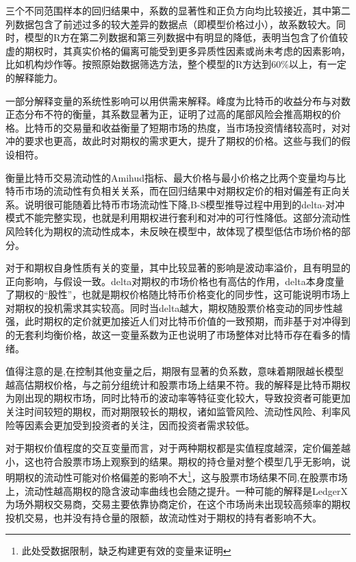 \newpage
\restoregeometry
\par{三个不同范围样本的回归结果中，系数的显著性和正负方向均比较接近，其中第二列数据包含了前述过多的较大差异的数据点（即模型价格过小），故系数较大。同时，模型的R方在第二列数据和第三列数据中有明显的降低，表明当包含了价值较虚的期权时，其真实价格的偏离可能受到更多异质性因素或尚未考虑的因素影响，比如机构炒作等。按照原始数据筛选方法，整个模型的R方达到60$\%$以上，有一定的解释能力。}
\par{
一部分解释变量的系统性影响可以用供需来解释。峰度为比特币的收益分布与对数正态分布不符的衡量，其系数显著为正，证明了过高的尾部风险会推高期权的价格。比特币的交易量和收益衡量了短期市场的热度，当市场投资情绪较高时，对对冲的要求也更高，故此时对期权的需求更大，提升了期权的价格。这些与我们的假设相符。}
\par{衡量比特币交易流动性的Amihud指标、最大价格与最小价格之比两个变量均与比特币市场的流动性有负相关关系，而在回归结果中对期权定价的相对偏差有正向关系。说明很可能随着比特币市场流动性下降,B-S模型推导过程中用到的delta-对冲模式不能完整实现，也就是利用期权进行套利和对冲的可行性降低。这部分流动性风险转化为期权的流动性成本，未反映在模型中，故体现了模型低估市场价格的部分。
}
\par{对于和期权自身性质有关的变量，其中比较显著的影响是波动率溢价，且有明显的正向影响，与假设一致。delta对期权的市场价格也有高估的作用，delta本身度量了期权的“股性”，也就是期权价格随比特币价格变化的同步性，这可能说明市场上对期权的投机需求其实较高。同时当delta越大，期权随股票价格变动的同步性越强，此时期权的定价就更加接近人们对比特币价值的一致预期，而非基于对冲得到的无套利均衡价格，故这一变量系数为正也说明了市场整体对比特币存在看多的情绪。}
\par{值得注意的是,在控制其他变量之后，期限有显著的负系数，意味着期限越长模型越高估期权价格，与之前分组统计和股票市场上结果不符。我的解释是比特币期权为刚出现的期权市场，同时比特币的波动率等特征变化较大，导致投资者可能更加关注时间较短的期权，而对期限较长的期权，诸如监管风险、流动性风险、利率风险等因素会更加受到投资者的关注，因而投资者需求较低。}
\par{对于期权价值程度的交互变量而言，对于两种期权都是实值程度越深，定价偏差越小，这也符合股票市场上观察到的结果。期权的持仓量对整个模型几乎无影响，说明期权的流动性可能对价格偏差的影响不大\footnote{此处受数据限制，缺乏构建更有效的变量来证明}，这与股票市场结果不同,在股票市场上，流动性越高期权的隐含波动率曲线也会随之提升\cite{doi:10.1002/fut.20531}。一种可能的解释是LedgerX为场外期权交易商，交易主要依靠协商定价，在这个市场尚未出现较高频率的期权投机交易，也并没有持仓量的限额，故流动性对于期权的持有者影响不大。}
